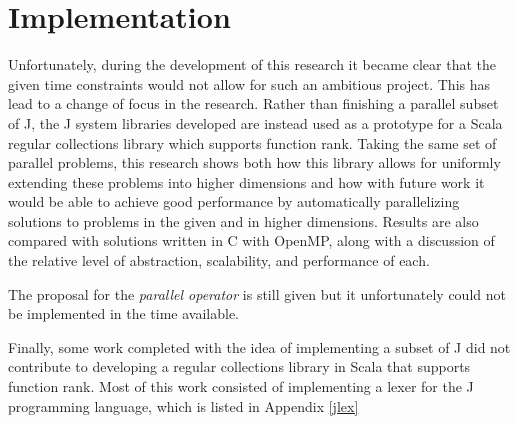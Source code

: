 \section{Implementation}
\label{imp}
Unfortunately, during the development of this research it became clear 
that the given time constraints would not allow for such an ambitious project.
This has lead to a change of focus in the research. 
Rather than finishing a parallel subset of J, the J system libraries developed 
are instead used as a prototype for a Scala regular collections library which supports function rank.
Taking the same set of parallel problems, 
this research shows both how this library allows for uniformly extending these problems into higher dimensions and 
how with future work it would be able to achieve good performance 
by automatically parallelizing solutions to problems in the given and in higher dimensions.
Results are also compared with solutions written in C with OpenMP, 
along with a discussion of the relative level of abstraction, scalability, and performance of each.

The proposal for the \textit{parallel operator} is still given but it unfortunately could not be implemented in the time available.

Finally, some work completed with the idea of implementing a subset of J 
did not contribute to developing a regular collections library in Scala that supports function rank.
Most of this work consisted of implementing a lexer for the J programming language, which is listed in Appendix \ref{jlex}
